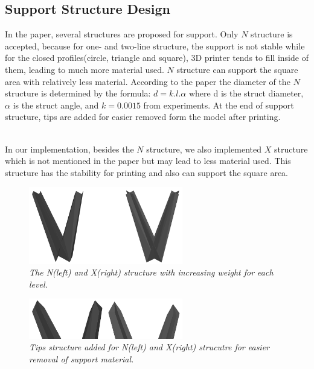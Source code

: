 \documentclass[11pt, a4paper]{article}
\begin{document}
	\subsection{Support Structure Design}
	In the paper, several structures are proposed for support. Only $N$ structure is accepted, because for one- and two-line structure, the support is not stable while for the closed profiles(circle, triangle and square), 3D printer tends to fill inside of them, leading to much more material used. $N$ structure can support the square area with relatively less material. According to the paper the diameter of the $N$ structure is determined by the formula: $d=k.l.\alpha$ where d is the struct diameter, $\alpha$ is the struct angle, and $k=0.0015$ from experiments. At the end of support structure, tips are added for easier removed form the model after printing.

	~\\In our implementation, besides the $N$ structure, we also implemented $X$ structure which is not mentioned in the paper but may lead to less material used. This structure has the stability for printing and also can support the square area.
	\begin{figure}[!ht]
  		\centering
      	\includegraphics[width=0.6\textwidth]{Figure_6.png}
  	\caption{\textit{The N(left) and X(right) structure with increasing weight for each level.}}
	\end{figure}
	\begin{figure}[!ht]
  		\centering
      	\includegraphics[width=0.6\textwidth]{Figure_7.png}
  	\caption{\textit{Tips structure added for N(left) and X(right) strucutre for easier removal of support material.}}
	\end{figure}
	\newpage
\end{document}
